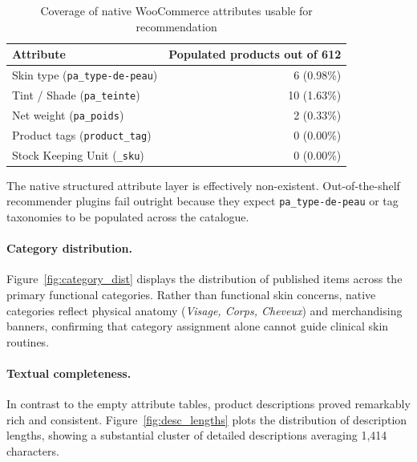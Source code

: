 \begin{table}[H]
\caption{Coverage of native WooCommerce attributes usable for recommendation}
\label{tab:attributes}
\centering
\begin{tabularx}{\textwidth}{X r}
\toprule
\textbf{Attribute} & \textbf{Populated products out of 612} \\
\midrule
Skin type (\texttt{pa\_type-de-peau}) & 6 (0.98\%) \\
Tint / Shade (\texttt{pa\_teinte}) & 10 (1.63\%) \\
Net weight (\texttt{pa\_poids}) & 2 (0.33\%) \\
Product tags (\texttt{product\_tag}) & 0 (0.00\%) \\
Stock Keeping Unit (\texttt{\_sku}) & 0 (0.00\%) \\
\bottomrule
\end{tabularx}
\end{table}

The native structured attribute layer is effectively non-existent. Out-of-the-shelf recommender plugins fail outright because they expect \texttt{pa\_type-de-peau} or tag taxonomies to be populated across the catalogue.

\paragraph{Category distribution.} Figure~\ref{fig:category_dist} displays the distribution of published items across the primary functional categories. Rather than functional skin concerns, native categories reflect physical anatomy (\emph{Visage, Corps, Cheveux}) and merchandising banners, confirming that category assignment alone cannot guide clinical skin routines.


\paragraph{Textual completeness.} In contrast to the empty attribute tables, product descriptions proved remarkably rich and consistent. Figure~\ref{fig:desc_lengths} plots the distribution of description lengths, showing a substantial cluster of detailed descriptions averaging 1{,}414 characters.



